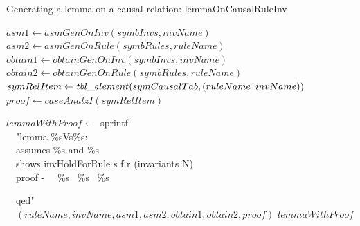\documentclass{llncs}
\def \twoSpaces {\ \ }
\def \cat {\symbol{94}}
\begin{document}
\begin{algorithm}
\caption{Generating a lemma on a causal relation: lemmaOnCausalRuleInv}\label{alg:lemmaOnCausalRuleInv}



{


 $asm1 \leftarrow asmGenOnInv(symbInvs,invName)$\;
 $asm2 \leftarrow asmGenOnRule(symbRules,ruleName)$\;
 $obtain1 \leftarrow obtainGenOnInv(symbInvs,invName)$\;
 $obtain2\leftarrow obtainGenOnRule(symbRules,ruleName)  $\;
  $symRelItem \leftarrow tbl\_element( symCausalTab,(ruleName\cat invName))$\;
 $proof \leftarrow caseAnalzI(symRelItem)$\;

$lemmaWithProof \leftarrow$ sprintf \\
\twoSpaces"lemma \%sVs\%s:\\
\twoSpaces assumes \%s and \%s\\
\twoSpaces  shows  invHoldForRule s f r (invariants   N)\\
\twoSpaces  proof -
\twoSpaces \%s~ \%s~  \%s

\twoSpaces qed"\\

\twoSpaces $(ruleName, invName, asm1,asm2, obtain1, obtain2, proof)$ \;
    \Return $lemmaWithProof$
}



\end{algorithm}





\end{document}
